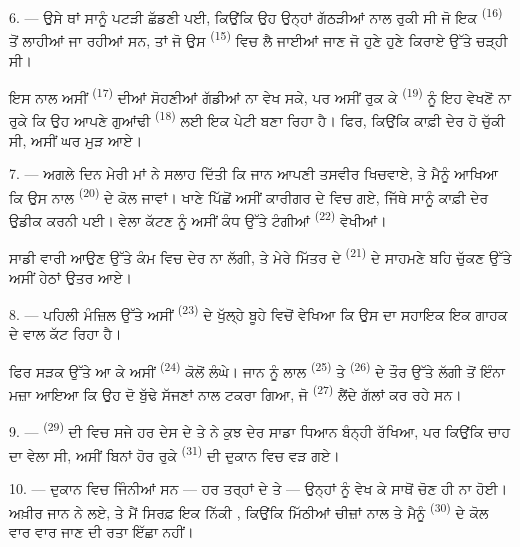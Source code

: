 6. --- ਉਸੇ ਥਾਂ ਸਾਨੂੰ ਪਟੜੀ ਛੱਡਣੀ ਪਈ, ਕਿਉਂਕਿ ਉਹ ਉਨ੍ਹਾਂ ਗੱਠੜੀਆਂ ਨਾਲ ਰੁਕੀ ਸੀ ਜੋ ਇਕ
 \textsuperscript{(16)} ਤੋਂ ਲਾਹੀਆਂ ਜਾ ਰਹੀਆਂ ਸਨ, ਤਾਂ ਜੋ ਉਸ
 \textsuperscript{(15)} ਵਿਚ ਲੈ ਜਾਈਆਂ ਜਾਣ ਜੋ ਹੁਣੇ ਹੁਣੇ ਕਿਰਾਏ ਉੱਤੇ ਚੜ੍ਹੀ
ਸੀ।

ਇਸ ਨਾਲ ਅਸੀਂ  \textsuperscript{(17)} ਦੀਆਂ ਸੋਹਣੀਆਂ ਗੱਡੀਆਂ ਨਾ
ਵੇਖ ਸਕੇ, ਪਰ ਅਸੀਂ ਰੁਕ ਕੇ  \textsuperscript{(19)} ਨੂੰ ਇਹ ਵੇਖਣੋਂ
ਨਾ ਰੁਕੇ ਕਿ ਉਹ ਆਪਣੇ ਗੁਆਂਢੀ  \textsuperscript{(18)}
ਲਈ ਇਕ ਪੇਟੀ ਬਣਾ ਰਿਹਾ ਹੈ। ਫਿਰ, ਕਿਉਂਕਿ ਕਾਫ਼ੀ ਦੇਰ ਹੋ ਚੁੱਕੀ ਸੀ, ਅਸੀਂ ਘਰ ਮੁੜ ਆਏ।

\VUsaut{3.0mm}

7. --- ਅਗਲੇ ਦਿਨ ਮੇਰੀ ਮਾਂ ਨੇ ਸਲਾਹ ਦਿੱਤੀ ਕਿ ਜਾਨ ਆਪਣੀ ਤਸਵੀਰ ਖਿਚਵਾਏ, ਤੇ ਮੈਨੂੰ ਆਖਿਆ
ਕਿ ਉਸ ਨਾਲ  \textsuperscript{(20)} ਦੇ ਕੋਲ ਜਾਵਾਂ। ਖਾਣੇ ਪਿੱਛੋਂ ਅਸੀਂ
ਕਾਰੀਗਰ ਦੇ  ਵਿਚ ਗਏ, ਜਿੱਥੇ ਸਾਨੂੰ ਕਾਫ਼ੀ ਦੇਰ ਉਡੀਕ ਕਰਨੀ ਪਈ। ਵੇਲਾ ਕੱਟਣ ਨੂੰ
ਅਸੀਂ ਕੰਧ ਉੱਤੇ ਟੰਗੀਆਂ  \textsuperscript{(22)} ਵੇਖੀਆਂ।

ਸਾਡੀ ਵਾਰੀ ਆਉਣ ਉੱਤੇ ਕੰਮ ਵਿਚ ਦੇਰ ਨਾ ਲੱਗੀ, ਤੇ ਮੇਰੇ ਮਿੱਤਰ ਦੇ 
\textsuperscript{(21)} ਦੇ ਸਾਹਮਣੇ ਬਹਿ ਚੁੱਕਣ ਉੱਤੇ ਅਸੀਂ ਹੇਠਾਂ ਉਤਰ ਆਏ।

8. --- ਪਹਿਲੀ ਮੰਜ਼ਿਲ ਉੱਤੇ ਅਸੀਂ  \textsuperscript{(23)} ਦੇ ਖੁੱਲ੍ਹੇ ਬੂਹੇ
ਵਿਚੋਂ ਵੇਖਿਆ ਕਿ ਉਸ ਦਾ ਸਹਾਇਕ ਇਕ ਗਾਹਕ ਦੇ ਵਾਲ ਕੱਟ ਰਿਹਾ ਹੈ।

ਫਿਰ ਸੜਕ ਉੱਤੇ ਆ ਕੇ ਅਸੀਂ  \textsuperscript{(24)} ਕੋਲੋਂ
ਲੰਘੇ। ਜਾਨ ਨੂੰ ਲਾਲ  \textsuperscript{(25)} ਤੇ 
\textsuperscript{(26)} ਦੇ ਤੌਰ ਉੱਤੇ ਲੱਗੀ  ਤੋਂ ਇੰਨਾ ਮਜ਼ਾ ਆਇਆ ਕਿ ਉਹ
ਦੋ ਬੁੱਢੇ ਸੱਜਣਾਂ ਨਾਲ ਟਕਰਾ ਗਿਆ, ਜੋ  \textsuperscript{(27)}
ਲੈਂਦੇ ਗੱਲਾਂ ਕਰ ਰਹੇ ਸਨ।

\VUsaut{3.0mm}

9. ---  \textsuperscript{(29)} ਦੀ  ਵਿਚ ਸਜੇ ਹਰ ਦੇਸ ਦੇ
 ਤੇ  ਨੇ ਕੁਝ ਦੇਰ ਸਾਡਾ ਧਿਆਨ ਬੰਨ੍ਹੀ ਰੱਖਿਆ, ਪਰ ਕਿਉਂਕਿ ਚਾਹ
ਦਾ ਵੇਲਾ ਸੀ, ਅਸੀਂ ਬਿਨਾਂ ਹੋਰ ਰੁਕੇ  \textsuperscript{(31)} ਦੀ ਦੁਕਾਨ ਵਿਚ
ਵੜ ਗਏ।

10. --- ਦੁਕਾਨ ਵਿਚ ਜਿੰਨੀਆਂ  ਸਨ — ਹਰ ਤਰ੍ਹਾਂ ਦੇ
 ਤੇ  — ਉਨ੍ਹਾਂ ਨੂੰ ਵੇਖ ਕੇ
ਸਾਥੋਂ ਚੋਣ ਹੀ ਨਾ ਹੋਈ। ਅਖ਼ੀਰ ਜਾਨ ਨੇ  ਲਏ, ਤੇ ਮੈਂ ਸਿਰਫ਼ ਇਕ ਨਿੱਕੀ
, ਕਿਉਂਕਿ ਮਿੱਠੀਆਂ ਚੀਜ਼ਾਂ ਨਾਲ  ਤੇ
ਮੈਨੂੰ  \textsuperscript{(30)} ਦੇ ਕੋਲ ਵਾਰ ਵਾਰ ਜਾਣ ਦੀ ਰਤਾ
ਇੱਛਾ ਨਹੀਂ।

